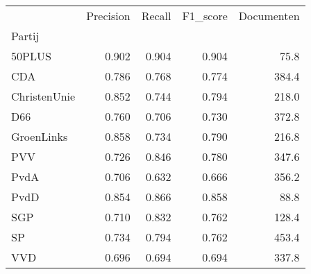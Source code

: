\begin{tabular}{lrrrr}
\toprule
{} &  Precision &  Recall &  F1\_score &  Documenten \\
Partij       &            &         &           &             \\
\midrule
50PLUS       &      0.902 &   0.904 &     0.904 &        75.8 \\
   CDA       &      0.786 &   0.768 &     0.774 &       384.4 \\
ChristenUnie &      0.852 &   0.744 &     0.794 &       218.0 \\
   D66       &      0.760 &   0.706 &     0.730 &       372.8 \\
  GroenLinks &      0.858 &   0.734 &     0.790 &       216.8 \\
   PVV       &      0.726 &   0.846 &     0.780 &       347.6 \\
  PvdA       &      0.706 &   0.632 &     0.666 &       356.2 \\
  PvdD       &      0.854 &   0.866 &     0.858 &        88.8 \\
   SGP       &      0.710 &   0.832 &     0.762 &       128.4 \\
    SP       &      0.734 &   0.794 &     0.762 &       453.4 \\
   VVD       &      0.696 &   0.694 &     0.694 &       337.8 \\
\bottomrule
\end{tabular}
